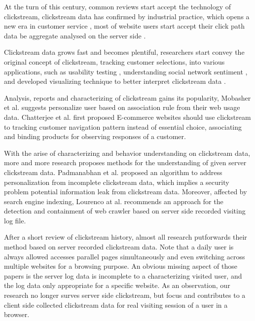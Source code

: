 At the turn of this century, common reviews start accept the technology of clickstream,
clickstream data has confirmed by industrial practice, which opens a new era in 
customer service \cite{walsh2000internet}, most of website users start accept their click path data 
be aggregate analysed on the server side \cite{carr2000hypermediation}.

Clickstream data grows fast and becomes plentiful, researchers start convey the original concept of clickstream,
tracking customer selections, into various applications, such as usability testing \cite{Waterson:2002:LOW:506443.506602},
understanding social network sentiment \cite{Schneider:2009:UOS:1644893.1644899}, and developed visualizing
technique to better interpret clickstream data \cite{Waterson:2002:DTU:1556262.1556276}.

Analysis, reports and characterizing of clickstream gains its popularity, Mobasher et al. \cite{Mobasher:2001:EPB:502932.502935}
suggests personalize user based on association rule from their web usage data. Chatterjee et al. \cite{chatterjee2003modeling} 
first proposed E-commerce websites should use clickstream to tracking customer navigation pattern instead of essential choice, 
associating and binding products for observing responses of a customer.

With the arise of characterizing and behavior understanding on clickstream data, more and more
research proposes methods for the understanding of given server clickstream data.
Padmanabhan et al. \cite{Padmanabhan:2001:PID:502512.502535}
proposed an algorithm to address personalization from incomplete clickstream data, which implies
a security problem potential information leak from clickstream data. 
Moreover, affected by search engine indexing, Lourenco at al. \cite{Lourenco:2006:CWC:1145581.1145634} recommends an approach for
the detection and containment of web crawler based on server side recorded visiting log file.

After a short review of clickstream history, almost all research putforwards their method 
based on server recorded clickstream data. Note that a daily user is always allowed accesses parallel pages simultaneously and even switching across multiple websites for 
a browsing purpose.
An obvious missing aspect of those papers is the server log data is incomplete to 
a characterizing visited user, and the log data only appropriate for a specific website. 
As an observation, our research no longer surves server side clickstream, 
but focus and contributes to a client side collected clickstream data for real visiting session of a user in a browser.

